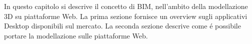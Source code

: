 In questo capitolo si descrive il concetto di BIM,
nell'ambito della modellazione 3D su piattaforme Web. La prima sezione fornisce
un overview sugli applicativi Desktop disponibili sul mercato. La seconda sezione
descrive come \'e possibile portare la modellazione sulle piattaforme Web.
